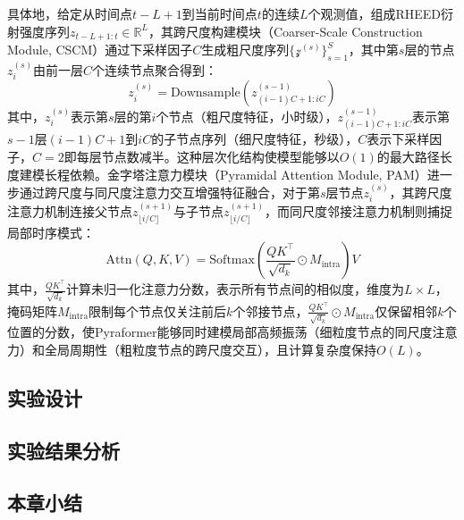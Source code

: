 具体地，给定从时间点$t - L + 1$到当前时间点$t$的连续$L$个观测值，组成RHEED衍射强度序列$z_{t-L+1:t} \in \mathbb{R}^L$，其跨尺度构建模块（Coarser-Scale Construction Module, CSCM）通过下采样因子$C$生成粗尺度序列$\{ \mathcal{z}^{(s)} \}_{s=1}^S$，其中第$s$层的节点$z_i^{(s)}$由前一层$C$个连续节点聚合得到：
\begin{equation}
    z_i^{(s)} = \text{Downsample}\left( z_{(i-1)C+1:iC}^{(s-1)} \right)
\end{equation}
其中，$z_i^{(s)}$表示第$s$层的第$i$个节点（粗尺度特征，小时级），$z_{(i-1)C+1:iC}^{(s-1)}$表示第$s−1$层$(i-1)C + 1$到$iC$的子节点序列（细尺度特征，秒级），$C$表示下采样因子，$C=2$即每层节点数减半。这种层次化结构使模型能够以$O(1)$的最大路径长度建模长程依赖。金字塔注意力模块（Pyramidal Attention Module, PAM）进一步通过跨尺度与同尺度注意力交互增强特征融合，对于第$s$层节点$z_i^{(s)}$，其跨尺度注意力机制连接父节点$z_{\lfloor i/C \rfloor}^{(s+1)}$与子节点$z_{\lfloor i/C \rfloor}^{(s+1)}$，而同尺度邻接注意力机制则捕捉局部时序模式：
\begin{equation}
    \text{Attn}(Q, K, V) = \text{Softmax}\left( \frac{QK^\top}{\sqrt{d_k}} \odot M_{\text{intra}} \right) V
\end{equation}
其中，$\frac{QK^\top}{\sqrt{d_k}}$计算未归一化注意力分数，表示所有节点间的相似度，维度为$L \times L$，掩码矩阵$M_{\text{intra}}$限制每个节点仅关注前后$k$个邻接节点，$\frac{QK^\top}{\sqrt{d_k}} \odot M_{\text{intra}}$仅保留相邻$k$个位置的分数，使Pyraformer能够同时建模局部高频振荡（细粒度节点的同尺度注意力）和全局周期性（粗粒度节点的跨尺度交互），且计算复杂度保持$O(L)$。

\subsection{实验设计}

\subsection{实验结果分析}

\subsection{本章小结}